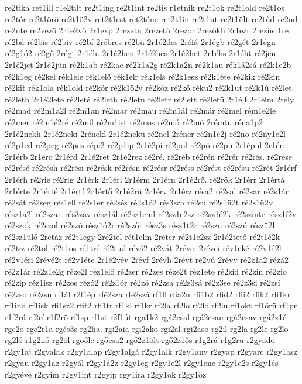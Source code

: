{re2tiká
ret1ill
r1e2tilt
re2t1ing
re2t1int
re2tis
r1etnik
re2t1ok
re2t1old
re2t1os
re2tór
re2t1örö
re2t1ö2v
ret2t1est
ret2téne
ret2t1in
re2t1ut
re2t1ült
re2tűd
re2ud
re2ute
re2vező
2r1e2vő
2r1exp
2rezetn
2rezetü
2rezor
2rezőkh
2r1ezr
2rezüs
1ré
ré2bá
ré2bis
ré2biv
ré2bí
2rébres
ré2bü
2r1é2des
2réfá
2r1égb
ré2gét
2r1égn
ré2g1ó2
ré2gő
2régt
2r1éh.
2r1é2hen
2r1é2hes
2r1é2het
2r1éhs
2r1éht
ré2jen
2r1é2jet
2r1é2jün
ré2k1ab
ré2kac
ré2k1a2g
ré2k1a2n
ré2k1au
rék1á2sá
ré2k1e2b
ré2k1eg
ré2kel
rék1ele
rék1elő
rék1elr
rék1els
ré2k1esz
ré2k1éte
ré2kik
ré2kin
ré2kit
rék1ola
rék1old
ré2kör
ré2k1ö2v
ré2köz
ré2kő
réku2
ré2k1ut
ré2k1ú
ré2let.
ré2letb
2r1é2lete
ré2leté
ré2leth
ré2letn
ré2letr
ré2lett
ré2letü
2r1élf
2r1élm
2rély
ré2mad
ré2m1a2l
ré2m1an
ré2mar
ré2mau
ré2m1ál
ré2már
ré2mel
rém1e2le
ré2mer
ré2m1é2ré
ré2mil
ré2m1ist
ré2mos
ré2mó
ré2mö
2rémtu
réna1p2
2r1é2nekh
2r1é2neki
2rénekl
2r1é2nekü
ré2nel
2réner
ré2n1é2j
ré2nö
ré2ny1e2l
ré2p1ed
ré2peg
ré2pes
répi2
ré2p1ip
2r1é2pí
ré2pol
ré2pö
ré2pü
2r1épül
2r1ér.
2r1érb
2r1érc
2r1érd
2r1é2ret
2r1é2rez
ré2ré.
ré2réb
ré2rén
ré2rér
ré2rés.
ré2rése
ré2résé
ré2résh
ré2rési
ré2résk
ré2résn
ré2résr
ré2réss
ré2rést
ré2résü
ré2rét
2r1érf
2r1érh
ré2rie
ré2rig
2r1érk
2r1érl
2r1érm
2r1érn
2r1é2rő.
ré2rők
2r1érr
2r1értá
2r1érte
2r1érté
2r1értí
2r1értő
2r1é2rü
2r1érv
2r1érz
résa2
ré2sal
ré2sar
ré2s1ár
ré2sát
ré2seg
rés1ell
ré2s1er
ré2sés
ré2s1ő2
rés3sza
ré2sú
ré2s1ü2t
ré2s1ü2v
rész1a2l
ré2szan
rés3zav
rész1ál
ré2sz1eml
ré2sz1e2sz
ré2sz1é2k
ré2szinte
rész1í2v
ré2szok
ré2szol
ré2szó
rész1ó2r
ré2szőr
rész3s
rész1t2r
ré2szu
ré2szú
részü2l
ré2sz1ülő
2rétáz
ré2t1egy
2ré2tel
rét1elm
2réter
ré2t1e2sz
2r1é2tető
ré2t1é2k
ré2tiz
ré2tol
ré2t1os
ré1tré
ré2tud
révá2
ré2vát
2réve.
2révei
rév1eké
ré2v1é2l
ré2v1éri
2révé2t
ré2v1éte
2r1é2vév
2révf
2révh
2révt
ré2vú
2révv
ré2z1a2
rézá2
ré2z1ár
ré2z1e2g
réze2l
réz1elő
ré2zer
ré2zes
réze2t
réz1ete
ré2zid
ré2zin
ré2zio
ré2zip
réz1isz
ré2zos
rézó2
ré2z1ór
ré2zö
ré2zsa
ré2z3sá
ré2z3se
ré2z3si
ré2zsí
ré2zso
ré2zsu
rf1ál
r2f1ép
rfé2sza
rfé2szá
rf1fl
rfia2n
rfi1b2
rfid2
rfii2
rfik2
rfi1kr
rf1ind
rf1isk
rfi1sz2
rfit2
rfi1tr
rf1kl
rf1kr
rf2la
rf2lo
rf2ló
rf2lu
rf1okt
rf1őrü
rf1pr
r1f2rá
rf2rí
r1f2rö
rf1sp
rf1st
r2f1út
rga1k2
rgá2csal
rgá2csan
rgá2csav
rgá2z1é
rge2o
rge2r1a
rgés3s
rg2ha.
rgi2aia
rgi2ako
rgi2al
rgi2aso
rg2il
rg2la
rg2le
rg2lo
rg2ló
r1g2nó
rg2öl
rgö3le
rgőcsa2
rgő2z1ölt
rgő2z1ős
r1g2rá
r1g2ru
r2gyado
r2gy1aj
r2gyalak
r2gy1alap
r2gy1algá
r2gy1alk
r2gy1any
r2gyap
r2gyarc
r2gy1asz
r2gyau
r2gy1az
r2gyál
r2gy1á2z
r2gy1eg
r2gy1e2l
r2gy1enc
r2gy1e2s
r2gy1és
r2gyévé
r2gyim
r2gy1int
r2gyip
rgy1ira
r2gy1ok
r2gy1öz
}
